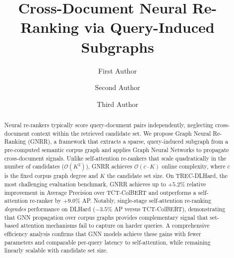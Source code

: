 \documentclass[runningheads]{llncs}
\newcommand{\ModelName}{GNRR\xspace}
\begin{document}
%
\title{Cross-Document Neural Re-Ranking via Query-Induced Subgraphs}
%
%
\author{First Author \and
Second Author \and
Third Author}
%
%
%
\maketitle
%
\begin{abstract}
Neural re-rankers typically score query-document pairs independently, neglecting cross-document context within the retrieved candidate set.
We propose Graph Neural Re-Ranking (\ModelName), a framework that extracts a sparse, query-induced subgraph from a pre-computed semantic corpus graph and applies Graph Neural Networks to propagate cross-document signals.
Unlike self-attention re-rankers that scale quadratically in the number of candidates ($\mathcal{O}(K^2)$), \ModelName achieves $\mathcal{O}(c \cdot K)$ online complexity, where $c$ is the fixed corpus graph degree and $K$ the candidate set size.
On TREC-DLHard, the most challenging evaluation benchmark, \ModelName achieves up to $+5.2\%$ relative improvement in Average Precision over TCT-ColBERT and outperforms a self-attention re-ranker by $+9.0\%$ AP\@.
Notably, single-stage self-attention re-ranking \emph{degrades} performance on DLHard ($-3.5\%$ AP versus TCT-ColBERT), demonstrating that GNN propagation over corpus graphs provides complementary signal that set-based attention mechanisms fail to capture on harder queries.
A comprehensive efficiency analysis confirms that GNN models achieve these gains with fewer parameters and comparable per-query latency to self-attention, while remaining linearly scalable with candidate set size.
\end{abstract}

\end{document}
